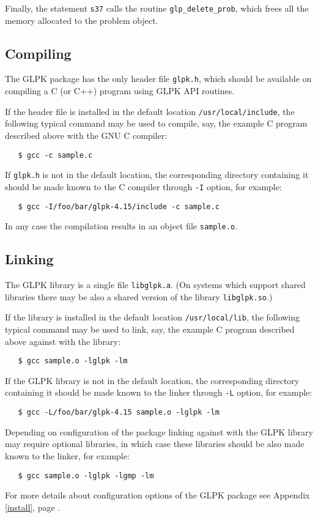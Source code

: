 Finally, the statement \verb|s37| calls the routine
\verb|glp_delete_prob|, which frees all the memory allocated to the
problem object.

\subsection{Compiling}

The GLPK package has the only header file \verb|glpk.h|, which should
be available on compiling a C (or C++) program using GLPK API routines.

If the header file is installed in the default location
\verb|/usr/local/include|, the following typical command may be used to
compile, say, the example C program described above with the GNU C
compiler:

\begin{verbatim}
   $ gcc -c sample.c
\end{verbatim}

If \verb|glpk.h| is not in the default location, the corresponding
directory containing it should be made known to the C compiler through
\verb|-I| option, for example:

\begin{verbatim}
   $ gcc -I/foo/bar/glpk-4.15/include -c sample.c
\end{verbatim}

In any case the compilation results in an object file \verb|sample.o|.

\subsection{Linking}

The GLPK library is a single file \verb|libglpk.a|. (On systems which
support shared libraries there may be also a shared version of the
library \verb|libglpk.so|.)

If the library is installed in the default
location \verb|/usr/local/lib|, the following typical command may be
used to link, say, the example C program described above against with
the library:

\begin{verbatim}
   $ gcc sample.o -lglpk -lm
\end{verbatim}

If the GLPK library is not in the default location, the corresponding
directory containing it should be made known to the linker through
\verb|-L| option, for example:

\begin{verbatim}
   $ gcc -L/foo/bar/glpk-4.15 sample.o -lglpk -lm
\end{verbatim}

Depending on configuration of the package linking against with the GLPK
library may require optional libraries, in which case these libraries
should be also made known to the linker, for example:

\begin{verbatim}
   $ gcc sample.o -lglpk -lgmp -lm
\end{verbatim}

For more details about configuration options of the GLPK package see
Appendix \ref{install}, page \pageref{install}.

